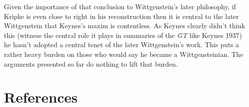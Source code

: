 \documentclass[noflushend]{philosophersimprint}
\begin{document}
Given the importance of that conclusion to Wittgenstein's later
philosophy, if Kripke is even close to right in his reconstruction then
it is central to the later Wittgenstein that Keynes's maxim is
contentless. As Keynes clearly didn't think this (witness the central
role it plays in summaries of the \emph{GT} like Keynes 1937) he hasn't
adopted a central tenet of the later Wittgenstein's work. This puts a
rather heavy burden on those who would say he became a Wittgensteinian.
The arguments presented so far do nothing to lift that burden.

\hypertarget{references}{%
\section*{References}\label{references}}
\end{document}
